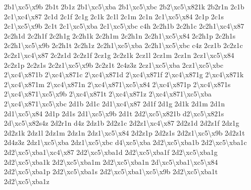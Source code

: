 {2b1\textbackslash{}xc5\textbackslash{}x9b 2b1t 2b1z 2b1\textbackslash{}xc5\textbackslash{}xba 2b1\textbackslash{}xc5\textbackslash{}xbc 2b2\textbackslash{}xc5\textbackslash{}x821k 2b2r1n 2c1b 2c1\textbackslash{}xc4\textbackslash{}x87 2c1d 2c1f 2c1g 2c1k 2c1l 2c1m 2c1n 2c1\textbackslash{}xc5\textbackslash{}x84 2c1p 2c1s 2c1\textbackslash{}xc5\textbackslash{}x9b 2c1t 2c1\textbackslash{}xc5\textbackslash{}xba 2c1\textbackslash{}xc5\textbackslash{}xbc c4h 2c2h1b 2c2h1c 2c2h1\textbackslash{}xc4\textbackslash{}x87 2c2h1d 2c2h1f 2c2h1g 2c2h1k 2c2h1m 2c2h1n 2c2h1\textbackslash{}xc5\textbackslash{}x84 2c2h1p 2c2h1s 2c2h1\textbackslash{}xc5\textbackslash{}x9b 2c2h1t 2c2h1z 2c2h1\textbackslash{}xc5\textbackslash{}xba 2c2h1\textbackslash{}xc5\textbackslash{}xbc c4z 2cz1b 2c2z1c 2c2z1\textbackslash{}xc4\textbackslash{}x87 2c2z1d 2c2z1f 2cz1g 2c2z1k 2cz1l 2cz1m 2cz1n 2cz1\textbackslash{}xc5\textbackslash{}x84 2c2z1p 2c2z1s 2c2z1\textbackslash{}xc5\textbackslash{}x9b 2c2z1t 2c4z3z 2cz1\textbackslash{}xc5\textbackslash{}xba 2cz1\textbackslash{}xc5\textbackslash{}xbc 2\textbackslash{}xc4\textbackslash{}x871b 2\textbackslash{}xc4\textbackslash{}x871c 2\textbackslash{}xc4\textbackslash{}x871d 2\textbackslash{}xc4\textbackslash{}x871f 2\textbackslash{}xc4\textbackslash{}x871g 2\textbackslash{}xc4\textbackslash{}x871k 2\textbackslash{}xc4\textbackslash{}x871m 2\textbackslash{}xc4\textbackslash{}x871n 2\textbackslash{}xc4\textbackslash{}x871\textbackslash{}xc5\textbackslash{}x84 2\textbackslash{}xc4\textbackslash{}x871p 2\textbackslash{}xc4\textbackslash{}x871s 2\textbackslash{}xc4\textbackslash{}x871\textbackslash{}xc5\textbackslash{}x9b 2\textbackslash{}xc4\textbackslash{}x871t 2\textbackslash{}xc4\textbackslash{}x871z 2\textbackslash{}xc4\textbackslash{}x871\textbackslash{}xc5\textbackslash{}xba 2\textbackslash{}xc4\textbackslash{}x871\textbackslash{}xc5\textbackslash{}xbc 2d1b 2d1c 2d1\textbackslash{}xc4\textbackslash{}x87 2d1f 2d1g 2d1k 2d1m 2d1n 2d1\textbackslash{}xc5\textbackslash{}x84 2d1p 2d1s 2d1\textbackslash{}xc5\textbackslash{}x9b 2d1t 2d2\textbackslash{}xc5\textbackslash{}x821b d2\textbackslash{}xc5\textbackslash{}x821s 2d\textbackslash{}xc5\textbackslash{}x82s4z 2d2r1n d4z 2dz1b 2d2z1c 2d2z1\textbackslash{}xc4\textbackslash{}x87 2d2z1d 2d2z1f 2dz1g 2d2z1k 2dz1l 2dz1m 2dz1n 2dz1\textbackslash{}xc5\textbackslash{}x84 2d2z1p 2d2z1s 2d2z1\textbackslash{}xc5\textbackslash{}x9b 2d2z1t 2d4z3z 2dz1\textbackslash{}xc5\textbackslash{}xba 2dz1\textbackslash{}xc5\textbackslash{}xbc d4\textbackslash{}xc5\textbackslash{}xba 2d2\textbackslash{}xc5\textbackslash{}xba1b 2d2\textbackslash{}xc5\textbackslash{}xba1c 2d2\textbackslash{}xc5\textbackslash{}xba1\textbackslash{}xc4\textbackslash{}x87 2d2\textbackslash{}xc5\textbackslash{}xba1d 2d2\textbackslash{}xc5\textbackslash{}xba1f 2d2\textbackslash{}xc5\textbackslash{}xba1g 2d2\textbackslash{}xc5\textbackslash{}xba1k 2d2\textbackslash{}xc5\textbackslash{}xba1m 2d2\textbackslash{}xc5\textbackslash{}xba1n 2d\textbackslash{}xc5\textbackslash{}xba1\textbackslash{}xc5\textbackslash{}x84 2d2\textbackslash{}xc5\textbackslash{}xba1p 2d2\textbackslash{}xc5\textbackslash{}xba1s 2d2\textbackslash{}xc5\textbackslash{}xba1\textbackslash{}xc5\textbackslash{}x9b 2d2\textbackslash{}xc5\textbackslash{}xba1t 2d2\textbackslash{}xc5\textbackslash{}xba1z }
